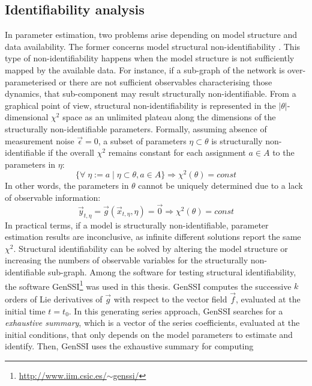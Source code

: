 \subsection{Identifiability analysis}
\label{subsec:Identifiability analysis}
In parameter estimation, two problems arise depending on model structure and data availability. The former concerns model structural non-identifiability \citep{Bellu2007, Raue2009, Raue2010, Balsa-Canto2010, Chis2011}. This type of non-identifiability happens when the model structure is not sufficiently mapped by the available data. For instance, if a sub-graph of the network is over-parameterised or there are not sufficient observables characterising those dynamics, that sub-component may result structurally non-identifiable. From a graphical point of view, structural non-identifiability is represented in the $|\theta|$-dimensional $\chi^2$ space as an unlimited plateau along the dimensions of the structurally non-identifiable parameters. Formally, assuming absence of measurement noise $\vec{\epsilon} = 0$, a subset of parameters $\eta \subset \theta$ is structurally non-identifiable if the overall $\chi^2$ remains constant for each assignment $a \in A$ to the parameters in $\eta$:
\begin{equation}
  \label{eq:structural_nonidentifiability_1}
  \{\forall \; \eta := a \; | \; \eta \subset \theta, a \in A\} \Rightarrow \chi^2(\theta) = const
\end{equation}
In other words, the parameters in $\theta$ cannot be uniquely determined due to a lack of observable information:
\begin{equation}
  \label{eq:structural_nonidentifiability_2}
  \vec{y}_{t,\eta} = \vec{g}(\vec{x}_{t,\eta},\eta) = \vec{0} \Rightarrow \chi^2(\theta) = const
\end{equation}
In practical terms, if a model is structurally non-identifiable, parameter estimation results are inconclusive, as infinite different solutions report the same $\chi^2$. Structural identifiability can be solved by altering the model structure or increasing the numbers of observable variables for the structurally non-identifiable sub-graph. Among the software for testing structural identifiability, the software GenSSI\footnote{\href{http://www.iim.csic.es/~genssi/}{http://www.iim.csic.es/$\sim$genssi/}} \citep{Balsa-Canto2010, Chis2011} was used in this thesis. GenSSI computes the successive $k$ orders of Lie derivatives of $\vec{g}$ with respect to the vector field $\vec{f}$, evaluated at the initial time $t=t_0$. In this generating series approach, GenSSI searches for a \emph{exhaustive summary}, which is a vector of the series coefficients, evaluated at the initial conditions, that only depends on the model parameters to estimate and identify. Then, GenSSI uses the exhaustive summary for computing 
